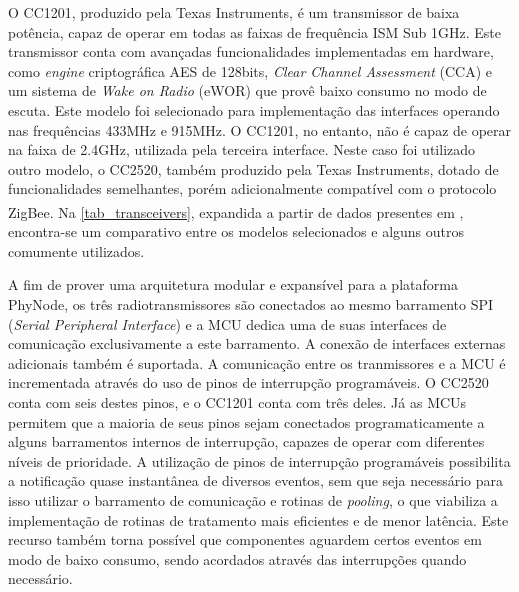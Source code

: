 \documentclass[
	12pt,				%
	openright,			%
	oneside,
	a4paper,			%
	english,			%
	french,				%
	spanish,			%
	brazil				%
	]{abntex2}
\begin{document}
O CC1201, produzido pela Texas Instruments, é um transmissor de baixa potência, capaz de operar em todas as faixas de frequência ISM Sub 1GHz. Este transmissor conta com avançadas funcionalidades implementadas em hardware, como \textit{engine} criptográfica AES de 128bits, \textit{Clear Channel Assessment} (CCA) e um sistema de \textit{Wake on Radio} (eWOR) que provê baixo consumo no modo de escuta. Este modelo foi selecionado para implementação das interfaces operando nas frequências 433MHz e 915MHz. O CC1201, no entanto, não é capaz de operar na faixa de 2.4GHz, utilizada pela terceira interface. Neste caso foi utilizado outro modelo, o CC2520, também produzido pela Texas Instruments, dotado de funcionalidades semelhantes, porém adicionalmente compatível com o protocolo ZigBee\textsuperscript{\textregistered}. Na \autoref{tab_transceivers}, expandida a partir de dados presentes em \cite{Baccour2012}, encontra-se um comparativo entre os modelos selecionados e alguns outros comumente utilizados.

A fim de prover uma arquitetura modular e expansível para a plataforma PhyNode, os três radiotransmissores são conectados ao mesmo barramento SPI (\textit{Serial Peripheral Interface}) e a MCU dedica uma de suas interfaces de comunicação exclusivamente a este barramento. A conexão de interfaces externas adicionais também é suportada. A comunicação entre os tranmissores e a MCU é incrementada através do uso de pinos de interrupção programáveis. O CC2520 conta com seis destes pinos, e o CC1201 conta com três deles. Já as MCUs permitem que a maioria de seus pinos sejam conectados programaticamente a alguns barramentos internos de interrupção, capazes de operar com diferentes níveis de prioridade. A utilização de pinos de interrupção programáveis possibilita a notificação quase instantânea de diversos eventos, sem que seja necessário para isso utilizar o barramento de comunicação e rotinas de \textit{pooling}, o que viabiliza a implementação de rotinas de tratamento mais eficientes e de menor latência. Este recurso também torna possível que componentes aguardem certos eventos em modo de baixo consumo, sendo acordados através das interrupções quando necessário.
\end{document}

